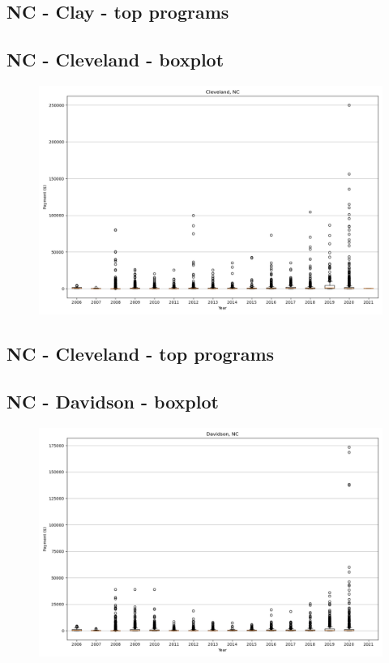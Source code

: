 \subsection*{NC - Clay - top programs}

\newpage
\subsection*{NC - Cleveland - boxplot}
\begin{figure}[h]
\centering
\includegraphics[width=7in]{../output/boxplots/counties/Cleveland-NC_boxplot.png}
\end{figure}


\subsection*{NC - Cleveland - top programs}

\newpage
\subsection*{NC - Davidson - boxplot}
\begin{figure}[h]
\centering
\includegraphics[width=7in]{../output/boxplots/counties/Davidson-NC_boxplot.png}
\end{figure}


